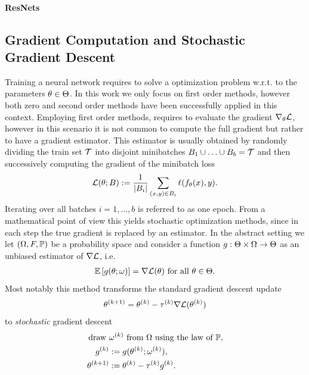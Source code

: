 \paragraph{ResNets}
%
\subsection{Gradient Computation and Stochastic Gradient Descent}\label{sec:SGD}
%
%
Training a neural network requires to solve a optimization problem w.r.t. to the parameters $\param\in\Param$. In this work we only focus on first order methods, however both zero \cite{Riedl} and second order methods \cite{Hessian} have been successfully applied in this context. Employing first order methods, requires to evaluate the gradient $\nabla_\theta \empLoss$, however in this scenario it is not common to compute the full gradient but rather to have a gradient estimator. This estimator is usually obtained by randomly dividing the train set $\trSet$ into disjoint minibatches $B_1\cup\ldots\cup B_b = \trSet$ and then successively computing the gradient of the minibatch loss
%
\begin{align*}
\empLoss(\param;B):=\frac{1}{\abs{B_i}}\sum_{(x,y)\in B_i} \ell(f_\param(x), y).
\end{align*}
%
%
Iterating over all batches $i=1,\ldots,b$ is referred to as one epoch. From a mathematical point of view this yields stochastic optimization methods, since in each step the true gradient is replaced by an estimator. In the abstract setting we let $(\Omega,F,\P)$ be a probability space and consider a function $g:\Param\times \Omega\to \Param$ as an unbiased estimator of $\nabla\empLoss$, i.e.
%
\begin{align*}
\Exp{g(\param;\omega)} = \nabla\empLoss(\param)\text{ for all } \param\in\Param.
\end{align*}
%
Most notably this method transforms the standard gradient descent update \cite{cauchy1847methode}
%
\begin{align*}
\param^{(k+1)} = \param^{(k)} - \tau^{(k)} \nabla \empLoss(\theta^{(k)})
\end{align*}
%
to \emph{stochastic} gradient descent \cite{robbins1951stochastic}
%
\begin{align*}
\text{draw }&\omega^{(k)}\text{ from }\Omega\text{ using the law of }\P,\\
g^{(k)} &:= {g(\param^{(k)};\omega^{(k)})},\\
\param^{(k+1)} &:= \param^{(k)} - \tau^{(k)} g^{(k)}.
\end{align*}
%
%
%
%
%
\clearpage%
